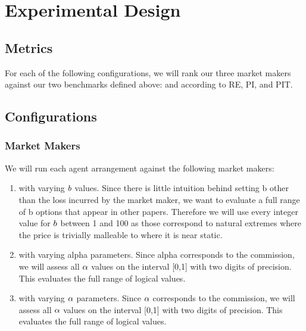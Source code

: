 \section{Experimental Design}
\subsection{Metrics}
For each of the following configurations, we will rank our three market makers against our two benchmarks defined above:  and  according to RE, PI, and PIT.

\subsection{Configurations}
\subsubsection{Market Makers}
We will run each agent arrangement against the following market makers:
\begin{enumerate}
\item {} with varying $b$ values. Since there is little intuition behind setting b other than the loss incurred by the market maker, we want to evaluate a full range of b options that appear in other papers. Therefore we will use every integer value for $b$ between 1 and 100 as those correspond to natural extremes where the price is trivially malleable to where it is near static.

\item {} with varying alpha parameters. Since alpha corresponds to the commission, we will assess all $\alpha$ values on the interval [0,1] with two digits of precision. This evaluates the full range of logical values.

\item {} with varying $\alpha$ parameters. Since $\alpha$ corresponds to the commission, we will assess all $\alpha$ values on the interval [0,1] with two digits of precision. This evaluates the full range of logical values.
\end{enumerate}

